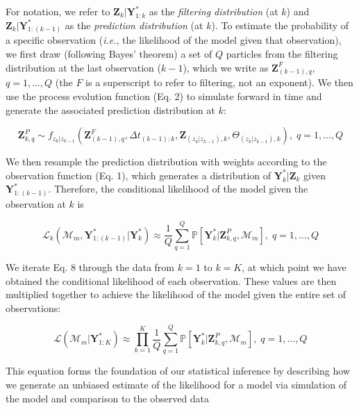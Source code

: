 \documentclass{article}
\begin{document}
For notation, we refer to $\textbf{Z}_{k}|\textbf{Y}^*_{1:k}$ as the \emph{filtering distribution} (at $k$) and $\textbf{Z}_{k}|\textbf{Y}^*_{1:(k-1)}$ as the \emph{prediction distribution} (at $k$). To estimate the probability of a specific observation (\emph{i.e.}, the likelihood of the model given that observation), we first draw (following Bayes' theorem) a set of $Q$ particles from the filtering distribution at the last observation ($k-1$), which we write as $\textbf{Z}^{F}_{(k-1),q}$, $q = 1, \ldots, Q$ (the $F$ is a superscript to refer to filtering, not an exponent). We then use the process evolution function (Eq. 2) to simulate forward in time and generate the associated prediction distribution at $k$:

\begin{equation}
\textbf{Z}^{P}_{k,q} \sim f_{z_k|z_{k-1}}(\textbf{Z}^{F}_{(k-1),q}, \Delta t_{(k-1):k}, \textbf{Z}_{(z_k|z_{k-1}), k},\Theta_{(z_k|z_{k-1}), k}), \; q = 1, \ldots, Q
\end{equation}

We then resample the prediction distribution with weights according to the observation function (Eq. 1), which generates a distribution of $\textbf{Y}^{*}_{k}|\textbf{Z}_{k}$ given $\textbf{Y}^{*}_{1:(k-1)}$. Therefore, the conditional likelihood of the model given the observation at $k$ is

\begin{equation}
\mathcal{L}_k(\mathcal{M}_m, \textbf{Y}^{*}_{1:(k-1)} | \textbf{Y}^{*}_{k}) \approx \frac{1}{Q}\sum_{q=1}^{Q}{\mathbb{P}[\textbf{Y}^*_k|\textbf{Z}^{P}_{k, q}, \mathcal{M}_m]}, \; q = 1, \ldots, Q
\end{equation}

We iterate Eq. 8 through the data from $k = 1$ to $k = K$, at which point we have obtained the conditional likelihood of each observation. These values are then multiplied together to achieve the likelihood of the model given the entire set of observations:

\begin{equation}
\mathcal{L}(\mathcal{M}_m | \textbf{Y}^{*}_{1:K}) \approx \prod_{k = 1}^{K}{\frac{1}{Q}\sum_{q=1}^{Q}{\mathbb{P}[\textbf{Y}^*_k|\textbf{Z}^{P}_{k, q}, \mathcal{M}_m]}}, \; q = 1, \ldots, Q
\end{equation}

This equation forms the foundation of our statistical inference by describing how we generate an unbiased estimate of the likelihood for a model via simulation of the model and comparison to the observed data \citep{Doucet2001,King2016}

  
\end{document}

